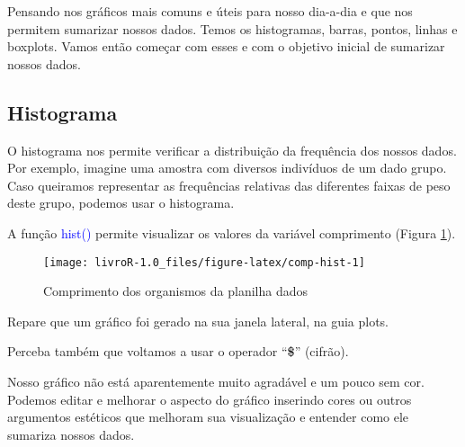 \documentclass[14pt,titlepage, oneside, openany, a4paper]{book}
\newenvironment{Shaded}{\begin{snugshade}}{\end{snugshade}}
\newcommand{\DataTypeTok}[1]{\textcolor[rgb]{0.13,0.29,0.53}{#1}}
\newcommand{\DecValTok}[1]{\textcolor[rgb]{0.00,0.00,0.81}{#1}}
\newcommand{\KeywordTok}[1]{\textcolor[rgb]{0.13,0.29,0.53}{\textbf{#1}}}
\newcommand{\NormalTok}[1]{#1}
\newcommand{\OperatorTok}[1]{\textcolor[rgb]{0.81,0.36,0.00}{\textbf{#1}}}
\newcommand{\StringTok}[1]{\textcolor[rgb]{0.31,0.60,0.02}{#1}}
\begin{document}
Pensando nos gráficos mais comuns e úteis para nosso dia-a-dia e que nos permitem sumarizar nossos dados. Temos os histogramas, barras, pontos, linhas e boxplots. Vamos então começar com esses e com o objetivo inicial de sumarizar nossos dados.

\hypertarget{histograma}{%
\subsection{Histograma}\label{histograma}}

O histograma nos permite verificar a distribuição da frequência dos nossos dados. Por exemplo, imagine uma amostra com diversos indivíduos de um dado grupo. Caso queiramos representar as frequências relativas das diferentes faixas de peso deste grupo, podemos usar o histograma.

A função \textcolor{blue}{hist()} permite visualizar os valores da variável comprimento (Figura \ref{fig:comp-hist}).

\begin{Shaded}
\end{Shaded}

\begin{figure}[H]
\texttt{[image: livroR-1.0\_files/figure-latex/comp-hist-1]} \caption{Comprimento dos organismos da planilha dados}\label{fig:comp-hist}
\end{figure}

Repare que um gráfico foi gerado na sua janela lateral, na guia plots.

Perceba também que voltamos a usar o operador ``\textbf{\$}'' (cifrão).

Nosso gráfico não está aparentemente muito agradável e um pouco sem cor. Podemos editar e melhorar o aspecto do gráfico inserindo cores ou outros argumentos estéticos que melhoram sua visualização e entender como ele sumariza nossos dados.

\begin{Shaded}
\end{Shaded}
\end{document}
